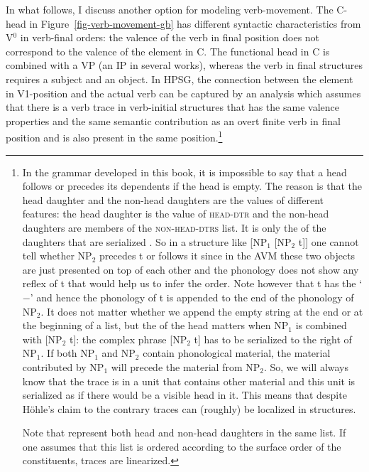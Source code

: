 {In what follows, I discuss another option for modeling verb-movement.
The C-head in Figure~\ref{fig-verb-movement-gb} has different syntactic characteristics from
V$^0$ in verb-final orders: the valence of the verb in final position does not correspond to
the valence of the element in C. The functional head in C is combined with a VP (an IP in several
works), whereas the verb in final structures requires a subject and an object. 
In HPSG, the connection between the element in V1-position and the actual verb can be captured by an analysis which
assumes that there is a verb trace in verb-initial structures that has the same valence properties and the same semantic
contribution as an overt finite verb in final position and is also present in the same
position.\footnote{%
  In the grammar developed in this book, it is impossible to say that a head follows or precedes its
  dependents if the head is empty. The reason is that the head daughter and the non-head daughters
  are the values of different features: the head daughter is the value of \textsc{head-dtr} and the
  non-head daughters are members of the \textsc{non-head-dtrs} list. It is only the \phonvs of the
  daughters that are serialized \citep{Hoehle94a}. So in a structure like [NP$_1$ [NP$_2$ t]] one cannot tell whether
  NP$_2$ precedes t or follows it since in the AVM these two objects are just presented on top of each
  other and the phonology does not show any reflex of t that would help us to infer the order. Note
  however that t has the \initialv `$-$' and hence the phonology of t is appended to the end of the
  phonology of NP$_2$. It does not matter whether we append the empty string at the end or at the
  beginning of a list, but the \initialv of the head matters when NP$_1$ is combined with [NP$_2$ t]:
  the complex phrase [NP$_2$ t] has to be serialized to the right of NP$_1$. If both NP$_1$ and
  NP$_2$ contain phonological material, the material contributed by NP$_1$ will precede the material
  from NP$_2$. So, we will always know that the trace is in a unit that contains other material and
  this unit is serialized as if there would be a visible head in it. This means that despite Höhle's
  claim to the contrary traces can (roughly) be localized in structures.

  Note that \citet{GSag2000a-u} represent both head and non-head daughters in the same list. If one
  assumes that this list is ordered according to the surface order of the constituents, traces are
  linearized.

}}
